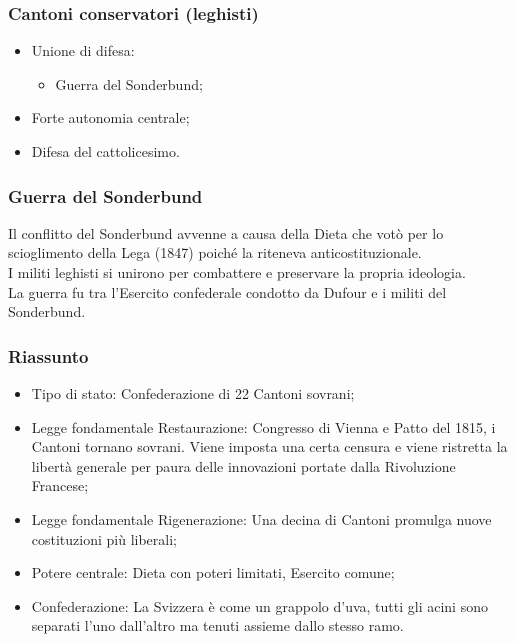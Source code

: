 \documentclass{article}
\begin{document}
\subsubsection{Cantoni conservatori (leghisti)}
\begin{itemize}
    \item Unione di difesa:
        \begin{itemize}
            \item Guerra del Sonderbund;
        \end{itemize}
    \item Forte autonomia centrale;
    \item Difesa del cattolicesimo.
\end{itemize}

\subsubsection{Guerra del Sonderbund}
Il conflitto del Sonderbund avvenne a causa della Dieta che votò per lo scioglimento della Lega
(1847) poiché la riteneva anticostituzionale.\\
I militi leghisti si unirono per combattere e preservare la propria ideologia.\\
La guerra fu tra l’Esercito confederale condotto da Dufour e i militi del Sonderbund.

\subsubsection{Riassunto}
\begin{itemize}
    \item Tipo di stato: Confederazione di 22 Cantoni sovrani;
    \item Legge fondamentale Restaurazione: Congresso di Vienna e Patto del 1815, i Cantoni 
        tornano sovrani. Viene imposta una certa censura e viene ristretta la libertà generale
        per paura delle innovazioni portate dalla Rivoluzione Francese;
    \item Legge fondamentale Rigenerazione: Una decina di Cantoni promulga nuove costituzioni
        più liberali;
    \item Potere centrale: Dieta con poteri limitati, Esercito comune;
    \item Confederazione: La Svizzera è come un grappolo d’uva, tutti gli acini sono separati
        l’uno dall’altro ma tenuti assieme dallo stesso ramo.
\end{itemize}
\end{document}
